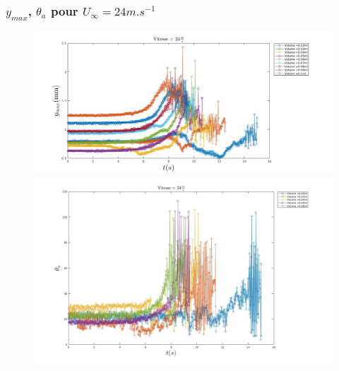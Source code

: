 \documentclass{beamer}
\begin{document}
\begin{frame}
	\frametitle{$y_{max}$, $\theta_{a}$ pour $U_{\infty}=24m.s^{-1}$}
\begin{figure}[!ht]
	\centering
	\begin{minipage}{0.5\linewidth}
		\includegraphics[width = \linewidth]{./image/v=24ym.jpg}
	\end{minipage}
	\vfill
	\begin{minipage}{0.5\linewidth}
	\includegraphics[width = \linewidth]{./image/v=24oa_2.jpg}
	\end{minipage}
\end{figure}
\end{frame}
\end{document}
